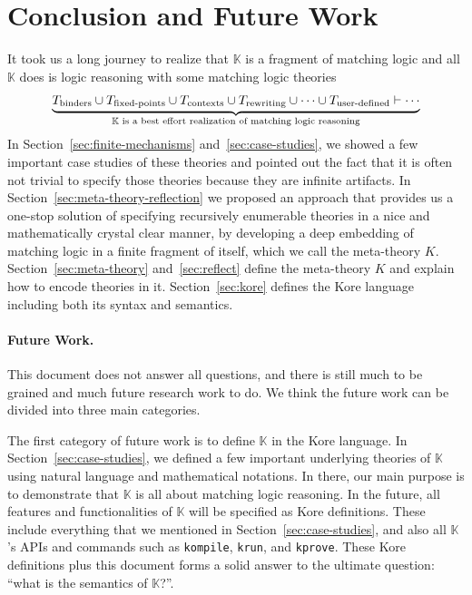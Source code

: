 \documentclass[UTF8,11pt]{article}
\theoremstyle{plain}
\theoremstyle{definition}
\theoremstyle{remark}
\newcommand{\K}{\mbox{$\mathbb{K}$}\xspace}
\begin{document}

\section{Conclusion and Future Work}
It took us a long journey to realize that \K is a fragment of matching logic 
and all \K does is logic reasoning with some matching logic theories
$$
\underbrace{T_\textrm{binders} \cup
T_\textrm{fixed-points} \cup 
T_\textrm{contexts} \cup 
T_\textrm{rewriting} \cup 
\cdots \cup 
T_\textrm{user-defined} \vdash \cdots}_
\text{\K is a best effort realization of matching logic reasoning}
$$
In Section~\ref{sec:finite-mechanisms} and~\ref{sec:case-studies}, we showed a 
few important case studies of these theories and pointed out the fact that
it is often not trivial to specify those theories because they are infinite 
artifacts. 
In Section~\ref{sec:meta-theory-reflection} we proposed an approach that 
provides us a one-stop solution of specifying recursively enumerable theories 
in a nice and mathematically crystal clear manner, by developing a deep 
embedding of matching logic in a finite fragment of itself, which we call the 
meta-theory $K$.
Section~\ref{sec:meta-theory} and~\ref{sec:reflect} define the meta-theory $K$ 
and explain how to encode theories in it.
Section~\ref{sec:kore} defines the Kore language including both its syntax and 
semantics.

\paragraph{Future Work.}
This document does not answer all questions, and there is still much to be 
grained and much future research work to do.
We think the future work can be divided into three main categories.

The first category of future work is to define \K in the Kore language.
In Section~\ref{sec:case-studies}, we defined a few important underlying 
theories of \K using natural language and mathematical notations.
In there, our main purpose is to demonstrate that \K is all about matching 
logic reasoning.
In the future, all features and functionalities of \K will be specified as 
Kore definitions.
These include everything that we mentioned in Section~\ref{sec:case-studies}, 
and also all \K's APIs and commands such as 
\texttt{kompile}, \texttt{krun}, and \texttt{kprove}.
These Kore definitions plus this document forms a solid answer to the ultimate 
question: ``what is the semantics of \K?''.
\end{document}

